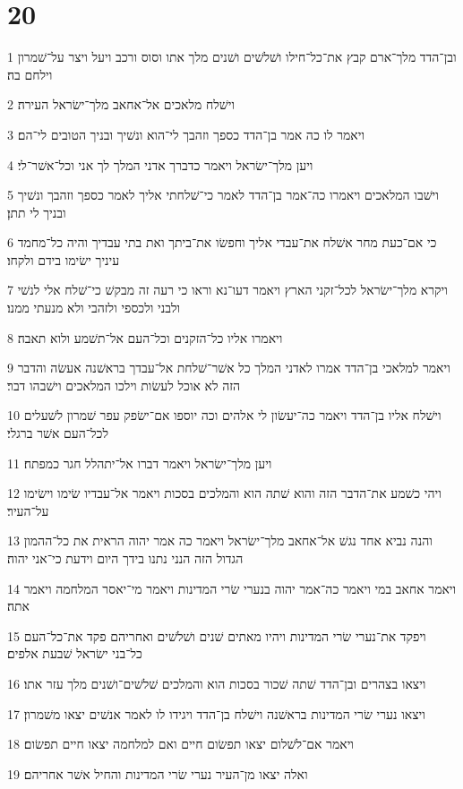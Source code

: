 \chapter{20}

\par 1 ובן־הדד מלך־ארם קבץ את־כל־חילו ושׁלשׁים ושׁנים מלך אתו וסוס ורכב ויעל ויצר על־שׁמרון וילחם בה׃
\par 2 וישׁלח מלאכים אל־אחאב מלך־ישׂראל העירה׃
\par 3 ויאמר לו כה אמר בן־הדד כספך וזהבך לי־הוא ונשׁיך ובניך הטובים לי־הם׃
\par 4 ויען מלך־ישׂראל ויאמר כדברך אדני המלך לך אני וכל־אשׁר־לי׃
\par 5 וישׁבו המלאכים ויאמרו כה־אמר בן־הדד לאמר כי־שׁלחתי אליך לאמר כספך וזהבך ונשׁיך ובניך לי תתן׃
\par 6 כי אם־כעת מחר אשׁלח את־עבדי אליך וחפשׂו את־ביתך ואת בתי עבדיך והיה כל־מחמד עיניך ישׂימו בידם ולקחו׃
\par 7 ויקרא מלך־ישׂראל לכל־זקני הארץ ויאמר דעו־נא וראו כי רעה זה מבקשׁ כי־שׁלח אלי לנשׁי ולבני ולכספי ולזהבי ולא מנעתי ממנו׃
\par 8 ויאמרו אליו כל־הזקנים וכל־העם אל־תשׁמע ולוא תאבה׃
\par 9 ויאמר למלאכי בן־הדד אמרו לאדני המלך כל אשׁר־שׁלחת אל־עבדך בראשׁנה אעשׂה והדבר הזה לא אוכל לעשׂות וילכו המלאכים וישׁבהו דבר׃
\par 10 וישׁלח אליו בן־הדד ויאמר כה־יעשׂון לי אלהים וכה יוספו אם־ישׂפק עפר שׁמרון לשׁעלים לכל־העם אשׁר ברגלי׃
\par 11 ויען מלך־ישׂראל ויאמר דברו אל־יתהלל חגר כמפתח׃
\par 12 ויהי כשׁמע את־הדבר הזה והוא שׁתה הוא והמלכים בסכות ויאמר אל־עבדיו שׂימו וישׂימו על־העיר׃
\par 13 והנה נביא אחד נגשׁ אל־אחאב מלך־ישׂראל ויאמר כה אמר יהוה הראית את כל־ההמון הגדול הזה הנני נתנו בידך היום וידעת כי־אני יהוה׃
\par 14 ויאמר אחאב במי ויאמר כה־אמר יהוה בנערי שׂרי המדינות ויאמר מי־יאסר המלחמה ויאמר אתה׃
\par 15 ויפקד את־נערי שׂרי המדינות ויהיו מאתים שׁנים ושׁלשׁים ואחריהם פקד את־כל־העם כל־בני ישׂראל שׁבעת אלפים׃
\par 16 ויצאו בצהרים ובן־הדד שׁתה שׁכור בסכות הוא והמלכים שׁלשׁים־ושׁנים מלך עזר אתו׃
\par 17 ויצאו נערי שׂרי המדינות בראשׁנה וישׁלח בן־הדד ויגידו לו לאמר אנשׁים יצאו משׁמרון׃
\par 18 ויאמר אם־לשׁלום יצאו תפשׂום חיים ואם למלחמה יצאו חיים תפשׂום׃
\par 19 ואלה יצאו מן־העיר נערי שׂרי המדינות והחיל אשׁר אחריהם׃
